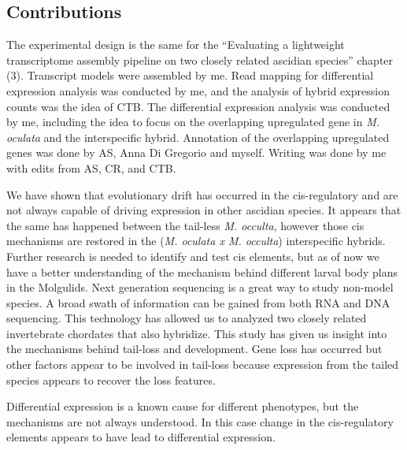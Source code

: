 \subsection{Contributions}
The experimental design is the same for the ``Evaluating a lightweight transcriptome assembly pipeline on two closely related ascidian species'' chapter (3). Transcript models were assembled by me. Read mapping for differential expression analysis was conducted by me, and the analysis of hybrid expression counts was the idea of CTB. The differential expression analysis was conducted by me, including the idea to focus on the overlapping upregulated gene in \textit{M. oculata} and the interspecific hybrid. Annotation of the overlapping upregulated genes was done by AS, Anna Di Gregorio and myself. Writing was done by me with edits from AS, CR, and CTB.
  
We have shown that evolutionary drift has occurred in the cis-regulatory and are not always capable of driving expression in other ascidian species. It appears that the same has happened between the tail-less \textit{M. occulta}, however those cis mechanisms are restored in the (\textit{M. oculata x M. occulta}) interspecific hybrids. Further research is needed to identify and test cis elements, but as of now we have a better understanding of the mechanism behind different larval body plans in the Molgulids. Next generation sequencing is a great way to study non-model species. A broad swath of information can be gained from both RNA and DNA sequencing. This technology has allowed us to analyzed two closely related invertebrate chordates that also hybridize. This study has given us insight into the mechanisms behind tail-loss and development. Gene loss has occurred but other factors appear to be involved in tail-loss because expression from the tailed species appears to recover the loss features. 

Differential expression is a known cause for different phenotypes, but the mechanisms are not always understood. In this case change in the cis-regulatory elements appears to have lead to differential expression.

